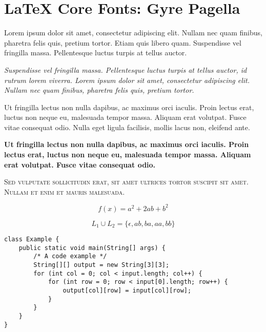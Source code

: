 \documentclass{article}
\begin{document}
\section*{LaTeX Core Fonts: Gyre Pagella}

\noindent\textrm{Lorem ipsum dolor sit amet, consectetur adipiscing elit. Nullam
nec quam finibus, pharetra felis quis, pretium tortor. Etiam quis libero quam.
Suspendisse vel fringilla massa. Pellentesque luctus turpis at tellus auctor.}

\bigskip\noindent\textit{Suspendisse vel fringilla massa. Pellentesque luctus
turpis at tellus auctor, id rutrum lorem viverra. Lorem ipsum dolor sit amet,
consectetur adipiscing elit. Nullam nec quam finibus, pharetra felis quis,
pretium tortor.}

\bigskip\noindent\textmd{Ut fringilla lectus non nulla dapibus, ac maximus orci
iaculis. Proin lectus erat, luctus non neque eu, malesuada tempor massa. Aliquam
erat volutpat. Fusce vitae consequat odio. Nulla eget ligula facilisis, mollis
lacus non, eleifend ante.}

\bigskip\noindent\textbf{Ut fringilla lectus non nulla dapibus, ac maximus orci
iaculis. Proin lectus erat, luctus non neque eu, malesuada tempor massa. Aliquam
erat volutpat. Fusce vitae consequat odio.}

\bigskip\noindent\textsc{Sed vulputate sollicitudin erat, sit amet ultrices
tortor suscipit sit amet. Nullam et enim et mauris malesuada.} 

\bigskip

\begin{equation}
    f(x) = a^2 + 2ab + b^2
\end{equation}

\begin{equation}
    L_1 \cup L_2 = \{\epsilon, ab, ba, aa, bb\}
\end{equation}

\bigskip

\begin{verbatim}
class Example {
    public static void main(String[] args) {
        /* A code example */
        String[][] output = new String[3][3];
        for (int col = 0; col < input.length; col++) {
            for (int row = 0; row < input[0].length; row++) {
                output[col][row] = input[col][row];
            }
        }
    }
}
\end{verbatim}
\end{document}
